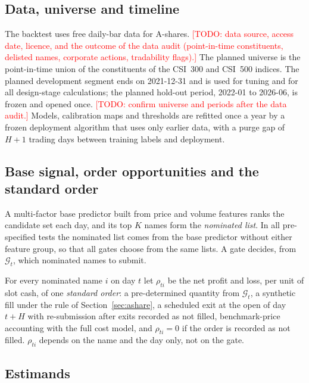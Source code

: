 \documentclass[11pt]{article}
\theoremstyle{remark}
\newcommand{\todo}[1]{\textcolor{red}{[TODO: #1]}}
\newcommand{\cG}{\mathcal{G}}
\begin{document}
\subsection{Data, universe and timeline}

The backtest uses free daily-bar data for A-shares.
\todo{data source, access date, licence, and the outcome of the data audit (point-in-time
constituents, delisted names, corporate actions, tradability flags).}
The planned universe is the point-in-time union of the constituents of the CSI~300 and CSI~500
indices. The planned development segment ends on 2021-12-31 and is used for tuning and for all
design-stage calculations; the planned hold-out period, 2022-01 to 2026-06, is frozen and opened
once.
\todo{confirm universe and periods after the data audit.}
Models, calibration maps and thresholds are refitted once a year by a frozen deployment
algorithm that uses only earlier data, with a purge gap of $H+1$ trading days between training
labels and deployment.

\subsection{Base signal, order opportunities and the standard order}

A multi-factor base predictor built from price and volume features ranks the candidate set each
day, and its top $K$ names form the \emph{nominated list}. In all pre-specified tests the
nominated list comes from the base predictor without either feature group, so that all gates
choose from the same lists. A gate decides, from $\cG_t$, which nominated names to submit.

For every nominated name $i$ on day $t$ let $\rho_{ti}$ be the net profit and loss, per unit of
slot cash, of one \emph{standard order}: a pre-determined quantity from $\cG_t$, a synthetic
fill under the rule of Section~\ref{sec:ashare}, a scheduled exit at the open of day $t+H$ with
re-submission after exits recorded as not filled, benchmark-price accounting with the full cost
model, and $\rho_{ti}=0$ if the order is recorded as not filled. $\rho_{ti}$ depends on the name
and the day only, not on the gate.

\subsection{Estimands}
\label{sec:estimands}
\end{document}
